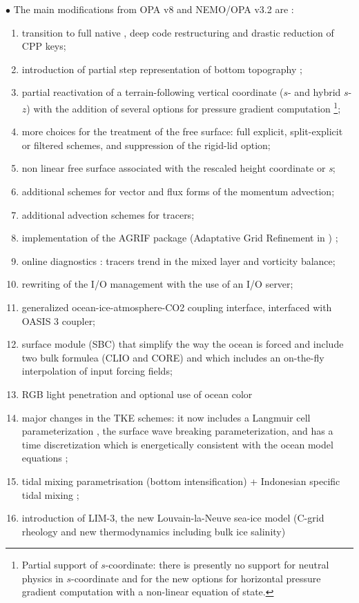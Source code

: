 \documentclass[../main/NEMO_manual]{subfiles}
\begin{document}
$\bullet$ The main modifications from OPA v8 and NEMO/OPA v3.2 are :\\
\begin{enumerate}
\item
  transition to full native \fninety, deep code restructuring and drastic reduction of CPP keys; 
\item
  introduction of partial step representation of bottom topography
  \citep{Barnier_al_OD06, Le_Sommer_al_OM09, Penduff_al_OS07};
\item
  partial reactivation of a terrain-following vertical coordinate ($s$- and hybrid $s$-$z$) with
  the addition of several options for pressure gradient computation
  \footnote{Partial support of $s$-coordinate: there is presently no support for neutral physics in
    $s$-coordinate and for the new options for horizontal pressure gradient computation with
    a non-linear equation of state.
  };
\item
  more choices for the treatment of the free surface: full explicit, split-explicit or filtered schemes,
  and suppression of the rigid-lid option;
\item
  non linear free surface associated with the rescaled height coordinate \zstar or \textit{s};
\item
  additional schemes for vector and flux forms of the momentum advection;
\item
  additional advection schemes for tracers;
\item
  implementation of the AGRIF package (Adaptative Grid Refinement in \fortran) \citep{Debreu_al_CG2008};
\item
  online diagnostics : tracers trend in the mixed layer and vorticity balance;
\item
  rewriting of the I/O management with the use of an I/O server;
\item
  generalized ocean-ice-atmosphere-CO2 coupling interface, interfaced with OASIS 3 coupler;
\item
  surface module (SBC) that simplify the way the ocean is forced and include two bulk formulea (CLIO and CORE) and
  which includes an on-the-fly interpolation of input forcing fields;
\item
  RGB light penetration and optional use of ocean color 
\item
  major changes in the TKE schemes: it now includes a Langmuir cell parameterization \citep{Axell_JGR02},
  the \citet{Mellor_Blumberg_JPO04} surface wave breaking parameterization, and has a time discretization which
  is energetically consistent with the ocean model equations \citep{Burchard_OM02, Marsaleix_al_OM08};
\item
  tidal mixing parametrisation (bottom intensification) + Indonesian specific tidal mixing
  \citep{Koch-Larrouy_al_GRL07};
\item
  introduction of LIM-3, the new Louvain-la-Neuve sea-ice model
  (C-grid rheology and new thermodynamics including bulk ice salinity)
  \citep{Vancoppenolle_al_OM09a, Vancoppenolle_al_OM09b}
\end{enumerate}
\end{document}
